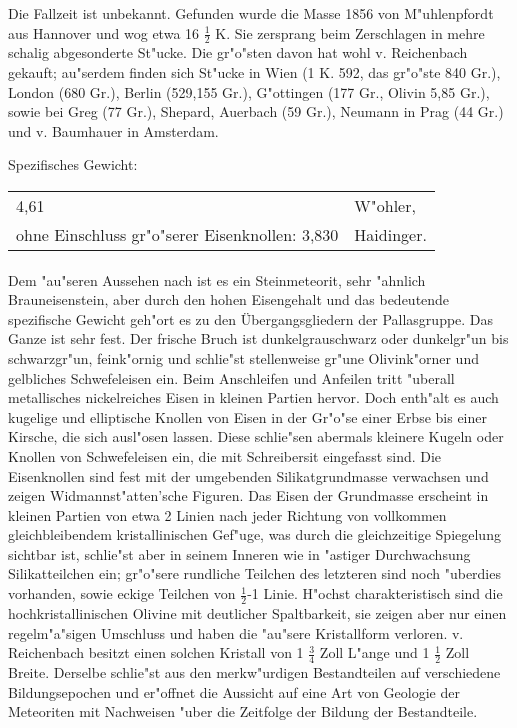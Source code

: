 \documentclass[a4paper, 11pt, oneside]{article}
\begin{document}
Die Fallzeit ist unbekannt. Gefunden wurde die Masse 1856 von M"uhlenpfordt aus Hannover und wog etwa 16 $\frac{1}{2}$ K. Sie zersprang beim Zerschlagen in mehre schalig abgesonderte St"ucke. Die gr"o"sten davon hat wohl v. Reichenbach gekauft; au"serdem finden sich St"ucke in Wien (1 K. 592, das gr"o"ste 840 Gr.), London (680 Gr.), Berlin (529,155 Gr.), G"ottingen (177 Gr., Olivin 5,85 Gr.), sowie bei Greg (77 Gr.), Shepard, Auerbach (59 Gr.), Neumann in Prag (44 Gr.) und v. Baumhauer in Amsterdam.

Spezifisches Gewicht: 
\begin{table}[!ht]
    \centering
    \begin{tabular}{l l}
        4,61 & W"ohler,\\
        ohne Einschluss gr"o"serer Eisenknollen: 3,830 & Haidinger.
    \end{tabular}
\end{table}
\paragraph{}
Dem "au"seren Aussehen nach ist es ein Steinmeteorit, sehr "ahnlich Brauneisenstein, aber durch den hohen Eisengehalt und das bedeutende spezifische Gewicht geh"ort es zu den Übergangsgliedern der Pallasgruppe. Das Ganze ist sehr fest. Der frische Bruch ist dunkelgrauschwarz oder dunkelgr"un bis schwarzgr"un, feink"ornig und schlie"st stellenweise gr"une Olivink"orner und gelbliches Schwefeleisen ein. Beim Anschleifen und Anfeilen tritt "uberall metallisches nickelreiches Eisen in kleinen Partien hervor. Doch enth"alt es auch kugelige und elliptische Knollen von Eisen in der Gr"o"se einer Erbse bis einer Kirsche, die sich ausl"osen lassen. Diese schlie"sen abermals kleinere Kugeln oder Knollen von Schwefeleisen ein, die mit Schreibersit eingefasst sind. Die Eisenknollen sind fest mit der umgebenden Silikatgrundmasse verwachsen und zeigen Widmannst"atten'sche Figuren. Das Eisen der Grundmasse erscheint in kleinen Partien von etwa 2 Linien nach jeder Richtung von vollkommen gleichbleibendem kristallinischen Gef"uge, was durch die gleichzeitige Spiegelung sichtbar ist, schlie"st aber in seinem Inneren wie in "astiger Durchwachsung Silikatteilchen ein; gr"o"sere rundliche Teilchen des letzteren sind noch "uberdies vorhanden, sowie eckige Teilchen von $\frac{1}{2}$-1 Linie. H"ochst charakteristisch sind die hochkristallinischen Olivine mit deutlicher Spaltbarkeit, sie zeigen aber nur einen regelm"a"sigen Umschluss und haben die "au"sere Kristallform verloren. v. Reichenbach besitzt einen solchen Kristall von 1 $\frac{3}{4}$ Zoll L"ange und 1 $\frac{1}{2}$ Zoll Breite. Derselbe schlie"st aus den merkw"urdigen Bestandteilen auf verschiedene Bildungsepochen und er"offnet die Aussicht auf eine Art von Geologie der Meteoriten mit Nachweisen "uber die Zeitfolge der Bildung der Bestandteile.
\end{document}
